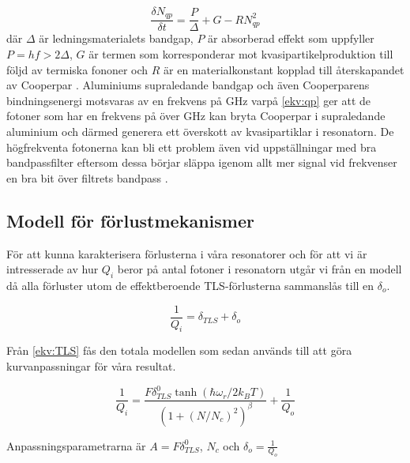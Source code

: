 \documentclass[main.tex]{subfiles}
\begin{document}
\begin{equation}
\label{ekv:qp}
    \frac{\delta N_{qp}}{\delta t}=\frac{P}{\Delta}+G-RN_{qp}^2
\end{equation}
där $\Delta$ är ledningsmaterialets bandgap, $P$ är absorberad effekt som uppfyller $P=hf>2\Delta$, $G$ är termen som korresponderar mot kvasipartikelproduktion till följd av termiska fononer och $R$ är en materialkonstant kopplad till återskapandet av Cooperpar \cite{Barends2011}. Aluminiums supraledande bandgap och även Cooperparens bindningsenergi motsvaras av en frekvens på \unit[88]{GHz} varpå \eqref{ekv:qp} ger att de fotoner som har en frekvens på över \unit[88]{GHz} kan bryta Cooperpar i supraledande aluminium och därmed generera ett överskott av kvasipartiklar i resonatorn.
De högfrekventa fotonerna kan bli ett problem även vid uppställningar med bra bandpassfilter eftersom dessa börjar släppa igenom allt mer signal vid frekvenser en bra bit över filtrets bandpass \cite{santavicca2008}.

\subsection{Modell för förlustmekanismer}
För att kunna karakterisera förlusterna i våra resonatorer och för att vi är intresserade av hur $Q_i$ beror på antal fotoner i resonatorn utgår vi från en modell då alla förluster utom de effektberoende TLS-förlusterna sammanslås till en $\delta_{o}$.

\begin{equation*}
    \frac{1}{Q_i}=\delta_{TLS}+\delta_{o}
\end{equation*}
\noindent

Från \ref{ekv:TLS} fås den totala modellen som sedan används till att göra kurvanpassningar för våra resultat.

\begin{equation}
    
    \frac{1}{Q_i}=\frac{F\delta_{TLS}^0\tanh{(\hbar\omega_r/2k_BT)}}{(1+(N/N_c)^2)^\beta}+\frac{1}{Q_{o}}
    \label{ekv:TLSmodel}
\end{equation}

Anpassningsparametrarna är $A=F\delta_{TLS}^0$, $N_c$ och $\delta_{o}=\frac{1}{Q_{o}}$
\end{document}
